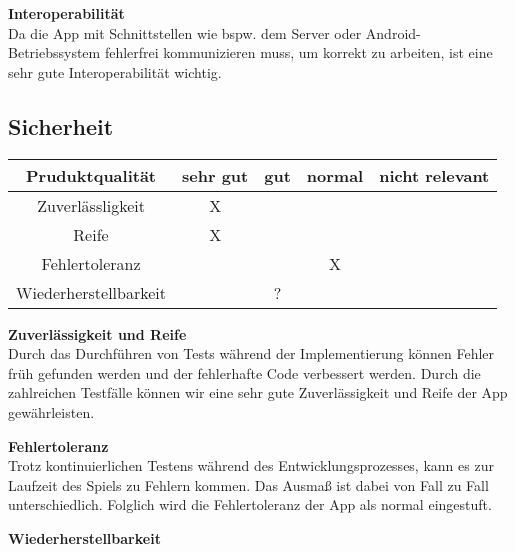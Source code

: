 \documentclass[parskip=full]{scrartcl}
\begin{document}
\textbf{Interoperabilität}\\
Da die App mit Schnittstellen wie bspw. dem Server oder Android-Betriebssystem fehlerfrei kommunizieren muss, um korrekt zu arbeiten, ist eine sehr gute Interoperabilität wichtig.

\subsection{Sicherheit}
\begin{tabular}{| c | c | c | c | c |}
    \hline
    \textbf{Pruduktqualität} & \textbf{sehr gut} & \textbf{gut} & \textbf{normal} & \textbf{nicht relevant} \\ \hline
    Zuverlässligkeit         & X                 &              &                 &                         \\ \hline
    Reife                    & X                 &              &                 &                         \\ \hline
    Fehlertoleranz           &                   &              & X               &                         \\ \hline
    Wiederherstellbarkeit    &                   & ?            &                 &                         \\ \hline
\end{tabular}

\textbf{Zuverlässigkeit und Reife}\\
Durch das Durchführen von Tests während der Implementierung können Fehler früh gefunden werden und der fehlerhafte Code verbessert werden.
Durch die zahlreichen Testfälle können wir eine sehr gute Zuverlässigkeit und Reife der App gewährleisten.

\textbf{Fehlertoleranz}\\
Trotz kontinuierlichen Testens während des Entwicklungsprozesses, kann es zur Laufzeit des Spiels zu Fehlern kommen.
Das Ausmaß ist dabei von Fall zu Fall unterschiedlich.
Folglich wird die Fehlertoleranz der App als normal eingestuft.

\textbf{Wiederherstellbarkeit}
\end{document}
